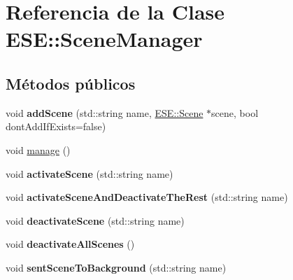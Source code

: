 \hypertarget{class_e_s_e_1_1_scene_manager}{\section{Referencia de la Clase E\-S\-E\-:\-:Scene\-Manager}
\label{class_e_s_e_1_1_scene_manager}
}
\subsection*{Métodos públicos}
\begin{DoxyCompactItemize}
\item 
\hypertarget{class_e_s_e_1_1_scene_manager_a8e015c62baeba7ec62bf52494b977cf9}{void {\bfseries add\-Scene} (std\-::string name, \hyperlink{class_e_s_e_1_1_scene}{E\-S\-E\-::\-Scene} $\ast$scene, bool dont\-Add\-If\-Exists=false)}\label{class_e_s_e_1_1_scene_manager_a8e015c62baeba7ec62bf52494b977cf9}

\item 
void \hyperlink{class_e_s_e_1_1_scene_manager_a8604839d539ecf138d3b773679d64396}{manage} ()
\item 
\hypertarget{class_e_s_e_1_1_scene_manager_af726a9763ab3f9fec3ed87c7e5859f3f}{void {\bfseries activate\-Scene} (std\-::string name)}\label{class_e_s_e_1_1_scene_manager_af726a9763ab3f9fec3ed87c7e5859f3f}

\item 
\hypertarget{class_e_s_e_1_1_scene_manager_ac35af6a5448740a9038f33e17bacb514}{void {\bfseries activate\-Scene\-And\-Deactivate\-The\-Rest} (std\-::string name)}\label{class_e_s_e_1_1_scene_manager_ac35af6a5448740a9038f33e17bacb514}

\item 
\hypertarget{class_e_s_e_1_1_scene_manager_ad2dc75bba3b9e480510228cd0288377e}{void {\bfseries deactivate\-Scene} (std\-::string name)}\label{class_e_s_e_1_1_scene_manager_ad2dc75bba3b9e480510228cd0288377e}

\item 
\hypertarget{class_e_s_e_1_1_scene_manager_a47a2b80f898c24a013b88bf27e941de0}{void {\bfseries deactivate\-All\-Scenes} ()}\label{class_e_s_e_1_1_scene_manager_a47a2b80f898c24a013b88bf27e941de0}

\item 
\hypertarget{class_e_s_e_1_1_scene_manager_ad7ccd504949840f0b128d86e519fe11d}{void {\bfseries sent\-Scene\-To\-Background} (std\-::string name)}\label{class_e_s_e_1_1_scene_manager_ad7ccd504949840f0b128d86e519fe11d}

\end{DoxyCompactItemize}
